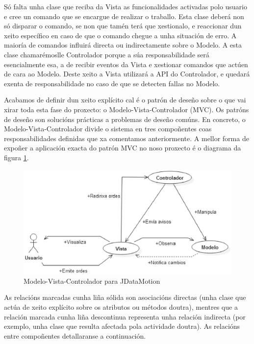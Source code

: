 Só falta unha clase que reciba da Vista as funcionalidades activadas polo usuario e cree un comando que se encargue de realizar o traballo. Esta clase deberá non só disparar o comando, se non que tamén terá que xestionalo, e reaccionar dun xeito específico en caso de que o comando chegue a unha situación de erro. A maioría de comandos influirá directa ou indirectamente sobre o Modelo. A esta clase chamarémoslle Controlador porque a súa responsabilidade será esencialmente esa, a de recibir eventos da Vista e xestionar comandos que actúen de cara ao Modelo. Deste xeito a Vista utilizará a API do Controlador, e quedará exenta de responsabilidade no caso de que se detecten fallas no Modelo.

Acabamos de definir dun xeito explícito cal é o patrón de deseño sobre o que vai xirar toda esta fase do proxecto: o Modelo-Vista-Controlador (MVC). Os patróns de deseño son solucións prácticas a problemas de deseño comúns. En concreto, o Modelo-Vista-Controlador divide o sistema en tres compoñentes coas responsabilidades definidas que xa comentamos anteriormente. A mellor forma de expoñer a aplicación exacta do patrón MVC no noso proxecto é o diagrama da figura \ref{MVC}.

\begin{figure}
\centering
\includegraphics[width=\textwidth,height=\textheight,keepaspectratio]{figuras/MVC}
\caption{Modelo-Vista-Controlador para JDataMotion}
\label{MVC}
\end{figure}

As relacións marcadas cunha liña sólida son asociacións directas (unha clase que actúa de xeito explícito sobre os atributos ou métodos doutra), mentres que a relación marcada cunha liña descontinua representa unha relación indirecta (por exemplo, unha clase que resulta afectada pola actividade doutra). As relacións entre compoñentes detallaranse a continuación.

